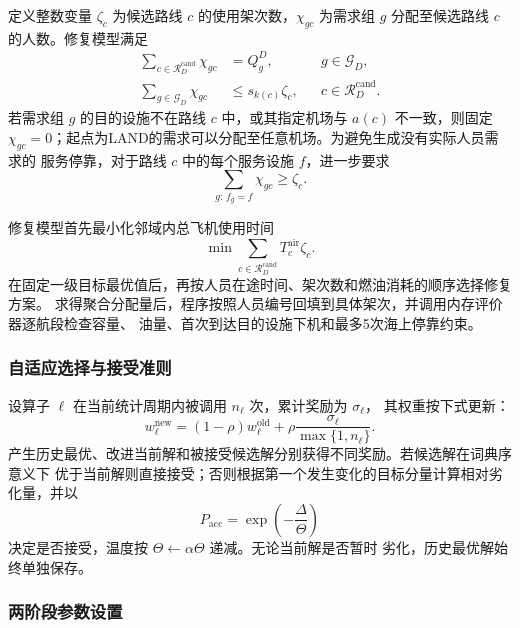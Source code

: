 定义整数变量 $\zeta_c$ 为候选路线 $c$ 的使用架次数，$\chi_{gc}$ 为需求组 $g$
分配至候选路线 $c$ 的人数。修复模型满足
\begin{align}
  \sum_{c\in\mathcal R_D^{\mathrm{cand}}}\chi_{gc}
  &=Q_g^D,
  &&g\in\mathcal G_D,\\
  \sum_{g\in\mathcal G_D}\chi_{gc}
  &\le s_{k(c)}\zeta_c,
  &&c\in\mathcal R_D^{\mathrm{cand}}.
\end{align}
若需求组 $g$ 的目的设施不在路线 $c$ 中，或其指定机场与 $a(c)$ 不一致，则固定
$\chi_{gc}=0$；起点为LAND的需求可以分配至任意机场。为避免生成没有实际人员需求的
服务停靠，对于路线 $c$ 中的每个服务设施 $f$，进一步要求
\begin{equation}
  \sum_{g:\,f_g=f}\chi_{gc}\ge \zeta_c.
\end{equation}

修复模型首先最小化邻域内总飞机使用时间
\begin{equation}
  \min \sum_{c\in\mathcal R_D^{\mathrm{cand}}}
  T_c^{\mathrm{air}}\zeta_c.
\end{equation}
在固定一级目标最优值后，再按人员在途时间、架次数和燃油消耗的顺序选择修复方案。
求得聚合分配量后，程序按照人员编号回填到具体架次，并调用内存评价器逐航段检查容量、
油量、首次到达目的设施下机和最多5次海上停靠约束。

\subsubsection{自适应选择与接受准则}

设算子 $\ell$ 在当前统计周期内被调用 $n_{\ell}$ 次，累计奖励为 $\sigma_{\ell}$，
其权重按下式更新：
\begin{equation}
  w_{\ell}^{\mathrm{new}}
  =(1-\rho)w_{\ell}^{\mathrm{old}}
  +\rho\frac{\sigma_{\ell}}{\max\{1,n_{\ell}\}}.
\end{equation}
产生历史最优、改进当前解和被接受候选解分别获得不同奖励。若候选解在词典序意义下
优于当前解则直接接受；否则根据第一个发生变化的目标分量计算相对劣化量，并以
\begin{equation}
  P_{\mathrm{acc}}=\exp\!\left(-\frac{\Delta}{\Theta}\right)
\end{equation}
决定是否接受，温度按 $\Theta\leftarrow\alpha\Theta$ 递减。无论当前解是否暂时
劣化，历史最优解始终单独保存。

\subsubsection{两阶段参数设置}

